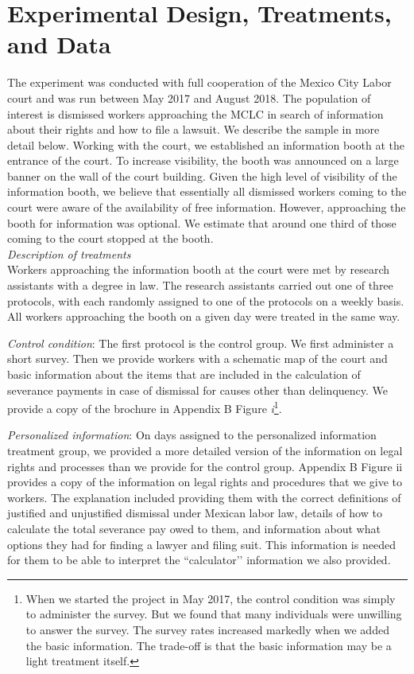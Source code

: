 \documentclass[12 pt]{article}
\begin{document}
\section{Experimental Design, Treatments, and Data} \label{sec:data}
The experiment was conducted with full cooperation of the Mexico City Labor court and was run between May 2017 and August 2018. The population of interest is dismissed workers approaching the MCLC in search of information about their rights and how to file a lawsuit. We describe the sample in more detail below. Working with the court, we established an information booth at the entrance of the court. To increase visibility, the booth was announced on a large banner on the wall of the court building. Given the high level of visibility of the information booth, we believe that essentially all dismissed workers coming to the court were aware of the availability of free information. However, approaching the booth for information was optional. We estimate that around one third of those coming to the court stopped at the booth. 
\[\]
\noindent\emph{Description of treatments}\\
Workers approaching the information booth at the court were met by research assistants with a degree in law. The research assistants carried out one of three protocols, with each randomly assigned to one of the protocols on a weekly basis. All workers approaching the booth on a given day were treated in the same way. 

\emph{Control condition}: The first protocol is the control group. We first administer a short survey. Then we provide workers with a schematic map of the court and basic information about the items that are included in the calculation of severance payments in case of dismissal for causes other than delinquency. We provide a copy of the brochure in Appendix B Figure \emph{i}\footnote{When we started the project in May 2017, the control condition was simply to administer the survey. But we found that many individuals were unwilling to answer the survey. The survey rates increased markedly when we added the basic information. The trade-off is that the basic information may be a light treatment itself.}. 

\emph{Personalized information}: On days assigned to the personalized information treatment group, we provided a more detailed version of the information on legal rights and processes than we provide for the control group. Appendix B Figure ii provides a copy of the information on legal rights and procedures that we give to workers. The explanation included providing them with the correct definitions of justified and unjustified dismissal under Mexican labor law, details of how to calculate the total severance pay owed to them, and information about what options they had for finding a lawyer and filing suit. This information is needed for them to be able to interpret the ``calculator’’ information we also provided.
\end{document}
